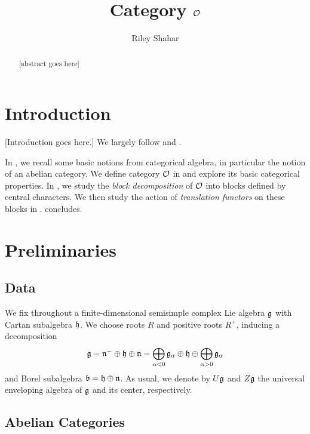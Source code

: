 \documentclass[11pt]{article}
\title{Category $\mathcal{O}$}
\author{Riley Shahar}
\date{}
\begin{document}
\maketitle

\begin{abstract}
	[abstract goes here]
\end{abstract}

\section{Introduction}

 [Introduction goes here.] We largely follow \cite{humphreys} and \cite[Chapter
	19]{carter}.

In , we recall some basic notions from categorical
algebra, in particular the notion of an abelian category. We define category
$\mathcal{O}$ in  and explore its basic categorical properties. In
, we study the \emph{block decomposition} of $\mathcal{O}$ into
blocks defined by central characters. We then study the action of
\emph{translation functors} on these blocks in .
 concludes.

\section{Preliminaries}
\label{sec:preliminaries}

\subsection{Data}

We fix throughout a finite-dimensional semisimple complex Lie algebra $\mathfrak{g}$ with
Cartan subalgebra $\mathfrak{h}$. We choose roots $R$ and positive roots $R^+$, inducing
a decomposition
\begin{equation}\label{eqn:cartan decomposition}
	\mathfrak{g} = \mathfrak{n}^-\oplus\mathfrak{h}\oplus\mathfrak{n} =
	\bigoplus_{\alpha<0}\mathfrak{g}_\alpha\oplus\mathfrak{h}\oplus\bigoplus_{\alpha>0}\mathfrak{g}_\alpha
\end{equation}
and Borel subalgebra $\mathfrak{b} = \mathfrak{h}\oplus\mathfrak{n}$. As usual, we denote by $U\mathfrak{g}$ and
$Z\mathfrak{g}$ the universal enveloping algebra of $\mathfrak{g}$ and its center, respectively.

\subsection{Abelian Categories}
\label{sec:abelian categories}
\end{document}

